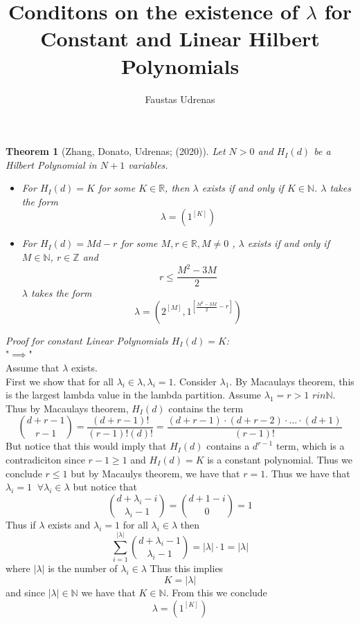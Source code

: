 \documentclass[11pt]{amsart}
\title{Conditons on the existence of $\lambda$ for Constant and Linear Hilbert Polynomials }
\author{Faustas Udrenas}
\newcommand{\Z}{\mathbb{Z}}
\newcommand{\R}{\mathbb{R}}
\newcommand{\N}{\mathbb{N}}
\theoremstyle{plain}
\newtheorem{theorem}{Theorem}[section]
\theoremstyle{definition}
\begin{document}
\maketitle
\begin{theorem}[Zhang, Donato, Udrenas; (2020)]
Let $N>0$ and $H_I(d)$ be a Hilbert Polynomial in $N+1$ variables. 
\begin{itemize}
\item For $H_I(d)=K$ for some $K\in \R$, then $\lambda$ exists if and only if  $K\in \N$. $\lambda$ takes the form  
\[\lambda = (1^{[K]})\]
\item For $H_I(d)=Md-r$ for some $M,r\in \R, M\neq 0$ , $\lambda$ exists if and only if $M\in \N$, $r\in \Z$ and
\[r\leq \frac{M^2-3M}{2}\]
$\lambda$ takes the form 
\[\lambda = (2^{[M]},1^{[\frac{M^2-3M}{2}-r]})\]
\end{itemize}
\end{theorem}

\newpage

\textit{Proof for constant Linear Polynomials $H_I(d)=K$:}\\
"$\implies$"\\
Assume that $\lambda$ exists.\\
First we show that  for all $\lambda_i\in \lambda,\lambda_i=1$. Consider $\lambda_1$. By Macaulays theorem, this is the largest lambda value in the lambda partition. Assume $\lambda_1=r>1$ $r in \N$. Thus by Macaulays theorem, $H_I(d)$ contains the term
\[\binom{d+r-1}{r-1}= \frac{(d+r-1)!}{(r-1)!(d)!}= \frac{(d+r-1)\cdot(d+r-2)\cdot\hdots\cdot(d+1)}{(r-1)!}\]
But notice that this would imply that $H_I(d)$ contains a $d^{r-1}$ term, which is a contradiciton since $r-1\geq1$ and $H_I(d)=K$ is a constant polynomial. Thus we conclude $r\leq1$ but by Macaulys theorem, we have that $r=1$. Thus we have that $\lambda_i =1 \;\; \forall \lambda_i\in \lambda$ but notice that
\[\binom{d+\lambda_i-i}{\lambda_i-1} = \binom{d+1-i}{0}  = 1\]
Thus if $\lambda$ exists and $\lambda_i=1$ for all $\lambda_i\in\lambda$ then 
\[\sum_{i=1}^{\big|\lambda\big|}\binom{d+\lambda_i-1}{\lambda_i-1} = \big|\lambda\big|\cdot 1 =\big|\lambda\big|\]
where $\big|\lambda\big|$ is the number of $\lambda_i \in \lambda$
Thus this implies
\[K=\big|\lambda\big|\]
and since $\big|\lambda\big|\in \N$ we have that $K \in \N$. From this we conclude
\[\lambda=(1^{[K]})\]
\end{document}
